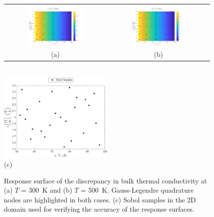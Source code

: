 \begin{figure}[htbp]
\begin{center}
\begin{tabular}{cc}
 \hspace{-10mm}
  \includegraphics[width=0.55\textwidth]{./Figures/err2D_300}
  &
  \includegraphics[width=0.55\textwidth]{./Figures/err2D_500}
  \\ (a) & (b)
  \end{tabular}
  \\ \vspace{1mm}
  \includegraphics[width=0.50\textwidth]{./Figures/err2D_s}
  \\ (c)
\caption{Response surface of the discrepancy in bulk thermal conductivity at (a) $T$ = 300~K and
 (b) $T$ = 500~K. Gauss-Legendre quadrature nodes are highlighted in both cases. (c) Sobol samples
 in the 2D domain used for verifying the accuracy of the response surfaces.}
\label{fig:rs2}
\end{center}
\end{figure}

